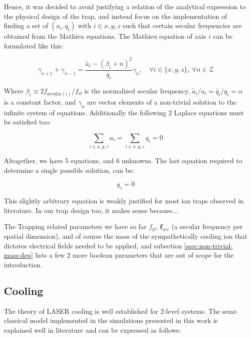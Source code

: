 Hence, it was decided to avoid justifying a relation of the analytical expression to the physical design of the trap, and instead focus on the implementation of finding a set of $(a_i, q_i)$ with $i \in {x,y,z}$ such that certain secular frequencies are obtained from the Mathieu equations. The Mathieu equation of axis $i$ can be formulated like this:

\begin{equation}
	\gamma_{n+1} + \gamma_{n-1} = \frac{\tilde{a}_i - \left(\beta_i + n\right)^2}{\tilde{q}_i} \gamma_n,\quad \forall i\in\{x,y,z\},\ \forall n\in\mathcal{Z}
	\label{eq:gamma_n-relation}
\end{equation}

Where $\beta_i \equiv 2 f_{\mathrm{secular}(i)}/f_\mathrm{rf}$ is the normalized secular frequency, $\tilde{a}_i/a_i = \tilde{q_i}/q_i = \alpha$ is a constant factor, and $\gamma_n$ are vector elements of a non-trivial solution to the infinite system of equations. Additionally the following 2 Laplace equations must be satisfied too:

\begin{equation}
	\sum_{i\in{x,y,z}} a_i = \sum_{i\in{x,y,z}} q_i = 0
	\label{eq:laplace}
\end{equation}

Altogether, we have 5 equations, and 6 unknowns. The last equation required to determine a single possible solution, can be:

\begin{equation}
	q_z = 0
\end{equation}

This slightly arbitrary equation is weakly justified for most ion traps observed in literature. In our trap design too, it makes sense because...

The Trapping related parameters we have so far $f_\mathrm{rf}$, $\mathbf{f}_{sec}$ (a secular frequency per spatial dimension), and of course the mass of the sympathetically cooling ion that dictates electrical fields needed to be applied, and subection \ref{ssec:non-trivial-mass-dep} lists a few 2 more boolean parameters that are out of scope for the introduction.

\subsection{Cooling}

The theory of LASER cooling is well established for 2-level systems. The semi-classical model implemented in the simulations presented in this work is explained well in literature\cite{TannoudjiCooling,SteckCooling} and can be expressed as follows:

